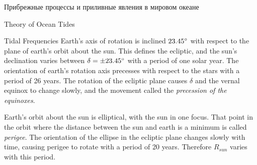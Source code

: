 \begin{chapter}{Прибрежные процессы и приливные явления в мировом океане}
\begin{section}{Theory of Ocean Tides}
\begin{paragraph}{Tidal Frequencies}
Earth's axis of rotation is inclined ${23.45}^\circ$ with respect to
the plane of earth's orbit about the sun. This defines the ecliptic,
and the sun's declination varies between $\delta = \pm {23.45}^\circ$
with a period of one solar year. The orientation of earth's rotation
axis precesses with respect to the stars with a period of 26 years. The rotation of the ecliptic plane causes $\delta$ and the
vernal equinox to change slowly, and the movement called the
\textit{precession of the equinoxes}.  
  
%

Earth's orbit about the sun is elliptical, with the sun in one
focus. That point in the orbit where the distance between the sun and
earth is a minimum is called \textit{perigee}.    
 The orientation of the ellipse in the ecliptic
plane changes slowly with time, causing perigee to rotate with a
period of 20 years. Therefore $R_{sun}$ varies with this
period.
%


\end{paragraph}
\end{section}
\end{chapter}
